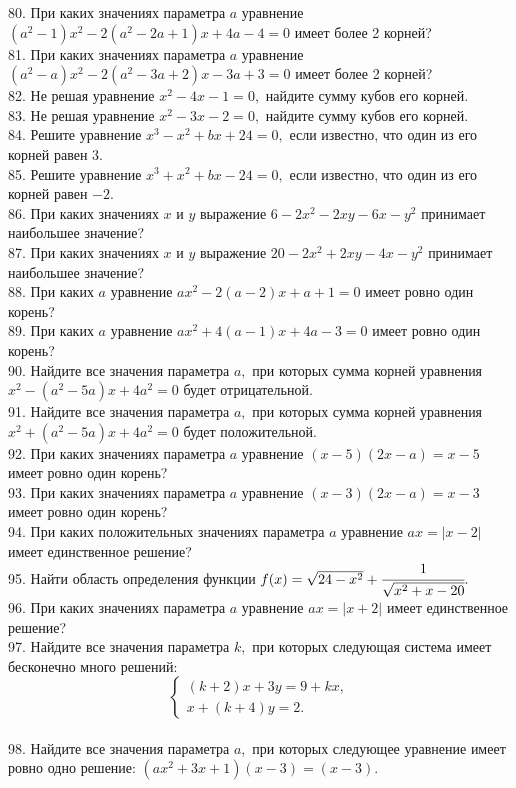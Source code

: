 \documentclass[12pt]{article}
\begin{document}
80. При каких значениях параметра $a$ уравнение $(a^2-1)x^2-2(a^2-2a+1)x+4a-4=0$ имеет более 2 корней?\\
81. При каких значениях параметра $a$ уравнение $(a^2-a)x^2-2(a^2-3a+2)x-3a+3=0$ имеет более 2 корней?\\
82. Не решая уравнение $x^2-4x-1=0,$ найдите сумму кубов его корней.\\
83. Не решая уравнение $x^2-3x-2=0,$ найдите сумму кубов его корней.\\
84. Решите уравнение $x^3-x^2+bx+24=0,$ если известно, что один из его корней равен $3.$\\
85. Решите уравнение $x^3+x^2+bx-24=0,$ если известно, что один из его корней равен $-2.$\\
86. При каких значениях $x$ и $y$ выражение $6-2x^2-2xy-6x-y^2$ принимает наибольшее значение?\\
87. При каких значениях $x$ и $y$ выражение $20-2x^2+2xy-4x-y^2$ принимает наибольшее значение?\\
88. При каких $a$ уравнение $ax^2-2(a-2)x+a+1=0$ имеет ровно один корень?\\
89. При каких $a$ уравнение $ax^2+4(a-1)x+4a-3=0$ имеет ровно один корень?\\
90. Найдите все значения параметра $a,$ при которых сумма корней уравнения $x^2-(a^2-5a)x+4a^2=0$ будет отрицательной.\\
91. Найдите все значения параметра $a,$ при которых сумма корней уравнения $x^2+(a^2-5a)x+4a^2=0$ будет положительной.\\
92. При каких значениях параметра $a$ уравнение $(x-5)(2x-a)=x-5$ имеет ровно один корень?\\
93. При каких значениях параметра $a$ уравнение $(x-3)(2x-a)=x-3$ имеет ровно один корень?\\
94. При каких положительных значениях параметра $a$ уравнение $ax=|x-2|$ имеет единственное решение?\\
95. Найти область определения функции $f(x)=\sqrt{24-x^2}+\cfrac{1}{\sqrt{x^2+x-20}}.$\\
96. При каких значениях параметра $a$ уравнение $ax=|x+2|$ имеет единственное решение?\\
97. Найдите все значения параметра $k,$ при которых следующая система имеет бесконечно много решений:
$$\begin{cases}
(k+2)x+3y=9+kx,\\
x+(k+4)y=2.
\end{cases}$$\\
98. Найдите все значения параметра $a,$ при которых следующее уравнение имеет ровно одно решение: $(ax^2+3x+1)(x-3)=(x-3).$\\
\end{document}
